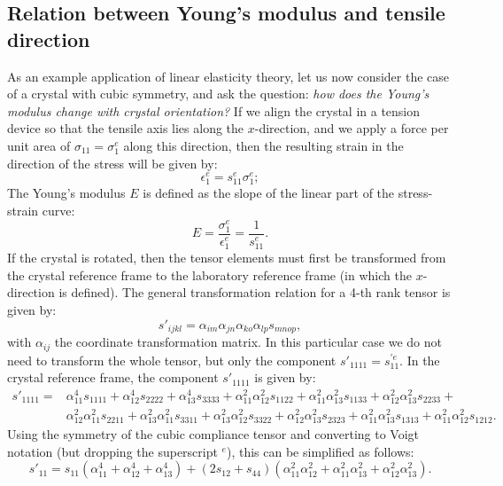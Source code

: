 \subsection{Relation between Young's modulus and tensile direction}
As an example application of linear elasticity theory, let us now consider the case of a crystal with cubic symmetry, and ask the question: \textit{how does the Young's modulus change with crystal orientation?}  If we align the crystal in a tension device so that the tensile axis lies along the $x$-direction, and we apply a force per unit area of $\sigma_{11}=\sigma^e_1$ along this direction, then the resulting strain in the direction of the stress will be given by:
\[
	\epsilon^e_{1} = s^e_{11}\sigma^e_{1};
\]
The Young's modulus $E$ is defined as the slope of the linear part of the stress-strain curve:
\[
	E = \frac{\sigma^e_1}{\epsilon^e_1} = \frac{1}{s^e_{11}}.
\]
If the crystal is rotated, then the tensor elements must first be transformed from the crystal reference frame to the laboratory reference frame (in which the $x$-direction is defined).  The general transformation relation for a 4-th rank tensor is given by:
\[
	s'_{ijkl} = \alpha_{im} \alpha_{jn} \alpha_{ko} \alpha_{lp}s_{mnop},
\]
with $\alpha_{ij}$ the coordinate transformation matrix.  In this particular case we do not need to transform the whole tensor, but only the component $s'_{1111}=s^{\prime e}_{11}$.  In the crystal reference frame, the component $s'_{1111}$ is given by:
\begin{align*}
	s'_{1111} 	=& 	\alpha_{11}^4s_{1111}+ \alpha_{12}^4s_{2222}+ \alpha_{13}^4s_{3333}+
				\alpha_{11}^2 \alpha_{12}^2s_{1122}+ \alpha_{11}^2 \alpha_{13}^2s_{1133}+ \alpha_{12}^2 \alpha_{13}^2s_{2233}+\\
			&	\alpha_{12}^2 \alpha_{11}^2s_{2211}+ \alpha_{13}^2 \alpha_{11}^2s_{3311}+ \alpha_{13}^2 \alpha_{12}^2s_{3322}+
				\alpha_{12}^2 \alpha_{13}^2s_{2323}+ \alpha_{11}^2 \alpha_{13}^2s_{1313}+ \alpha_{11}^2 \alpha_{12}^2s_{1212}.
\end{align*}
Using the symmetry of the cubic compliance tensor and converting to Voigt notation (but dropping the superscript $^e$), this can be simplified as follows:
\begin{equation}
	s'_{11} = s_{11}(\alpha_{11}^4+ \alpha_{12}^4+ \alpha_{13}^4)+(2s_{12}+s_{44})(\alpha_{11}^2 \alpha_{12}^2
	+ \alpha_{11}^2 \alpha_{13}^2+ \alpha_{12}^2 \alpha_{13}^2).
\end{equation}


